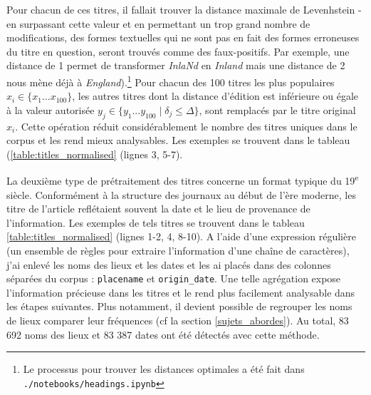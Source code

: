 \documentclass[a4paper,twoside,12pt]{article}
\begin{document}
Pour chacun de ces titres, il fallait trouver la distance maximale de Levenhstein - en surpassant cette valeur et en permettant un trop grand nombre de modifications, des formes textuelles qui ne sont pas en fait des formes erroneuses du titre en question, seront trouvés comme des faux-positifs. Par exemple, une distance de 1 permet de transformer \textit{InlaNd} en \textit{Inland} mais une distance de 2 nous mène déjà à \textit{England}).\footnote{Le processus pour trouver les distances optimales a été fait dans \texttt{./notebooks/headings.ipynb}} Pour chacun des 100 titres les plus populaires \(x_i \in \{x_1 ... x_{100}\}\), les autres titres dont la distance d'édition est inférieure ou égale à la valeur autorisée \(y_j \in \{y_1 ... y_{100} \mid \delta_j \le \Delta\}\), sont remplacés par le titre original \(x_i\). Cette opération réduit considérablement le nombre des titres uniques dans le corpus et les rend mieux analysables. Les exemples se trouvent dans le tableau (\ref{table:titles_normalised} (lignes 3, 5-7).

La deuxième type de prétraitement des titres concerne un format typique du 19\textsuperscript{e} siècle. Conformément à la structure des journaux au début de l'ère moderne, les titre de l'article reflétaient souvent la date et le lieu de provenance de l'information. Les exemples de tels titres se trouvent dans le tableau \ref{table:titles_normalised} (lignes 1-2, 4, 8-10). A l'aide d'une expression régulière (un ensemble de règles pour extraire l'information d'une chaîne de caractères), j'ai enlevé les noms des lieux et les dates et les ai placés dans des colonnes séparées du corpus : \texttt{placename} et \texttt{origin\_date}. Une telle agrégation expose l'information précieuse dans les titres et le rend plus facilement analysable dans les étapes suivantes. Plus notamment, il devient possible de regrouper les noms de lieux comparer leur fréquences (cf la section \ref{sujets_abordes}). Au total, 83 692 noms des lieux et 83 387 dates ont été détectés avec cette méthode.
\end{document}
